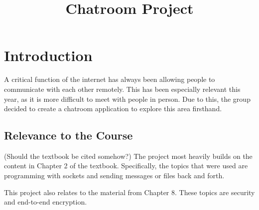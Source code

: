 \documentclass{article}
\begin{document}
\sloppy



\title{Chatroom Project}
%
\address{}


\maketitle


%
\begin{abstract}



\end{abstract}
%
%
\section{Introduction}
\label{sec:intro}
A critical function of the internet has always been allowing people to communicate with each other remotely. This has been especially relevant this year, as it is more difficult to meet with people in person. Due to this, the group decided to create a chatroom application to explore this area firsthand. 

\subsection{Relevance to the Course}

(Should the textbook be cited somehow?)
The project most heavily builds on the content in Chapter 2 of the textbook. Specifically, the topics that were used are programming with sockets and sending messages or files back and forth. 

This project also relates to the material from Chapter 8. These topics are security and end-to-end encryption. 
\end{document}
